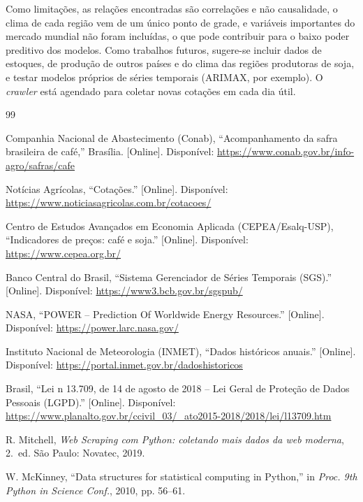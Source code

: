 \documentclass[conference]{IEEEtran}
\begin{document}
Como limitações, as relações encontradas são correlações e não causalidade, o clima de cada região
vem de um único ponto de grade, e variáveis importantes do mercado mundial não foram incluídas, o que pode contribuir para o baixo poder preditivo dos modelos. Como trabalhos futuros, sugere-se incluir dados de estoques,
de produção de outros países e do clima das regiões produtoras de soja, e testar modelos próprios de
séries temporais (ARIMAX, por exemplo). O \emph{crawler} está agendado para coletar novas cotações em cada dia útil.

\begin{thebibliography}{99}

Companhia Nacional de Abastecimento (Conab), ``Acompanhamento da safra brasileira de café,'' Brasília.
[Online]. Disponível: \url{https://www.conab.gov.br/info-agro/safras/cafe}

Notícias Agrícolas, ``Cotações.'' [Online]. Disponível:
\url{https://www.noticiasagricolas.com.br/cotacoes/}

Centro de Estudos Avançados em Economia Aplicada (CEPEA/Esalq-USP), ``Indicadores de preços: café e
soja.'' [Online]. Disponível: \url{https://www.cepea.org.br/}

Banco Central do Brasil, ``Sistema Gerenciador de Séries Temporais (SGS).'' [Online]. Disponível:
\url{https://www3.bcb.gov.br/sgspub/}

NASA, ``POWER -- Prediction Of Worldwide Energy Resources.'' [Online]. Disponível:
\url{https://power.larc.nasa.gov/}

Instituto Nacional de Meteorologia (INMET), ``Dados históricos anuais.'' [Online]. Disponível:
\url{https://portal.inmet.gov.br/dadoshistoricos}

Brasil, ``Lei n\textordmasculine{} 13.709, de 14 de agosto de 2018 -- Lei Geral de Proteção de Dados Pessoais (LGPD).''
[Online]. Disponível: \url{https://www.planalto.gov.br/ccivil_03/_ato2015-2018/2018/lei/l13709.htm}

R. Mitchell, \emph{Web Scraping com Python: coletando mais dados da web moderna}, 2.~ed. São Paulo:
Novatec, 2019.

W. McKinney, ``Data structures for statistical computing in Python,'' in \emph{Proc. 9th Python in Science
Conf.}, 2010, pp. 56--61.


\end{thebibliography}
\end{document}
